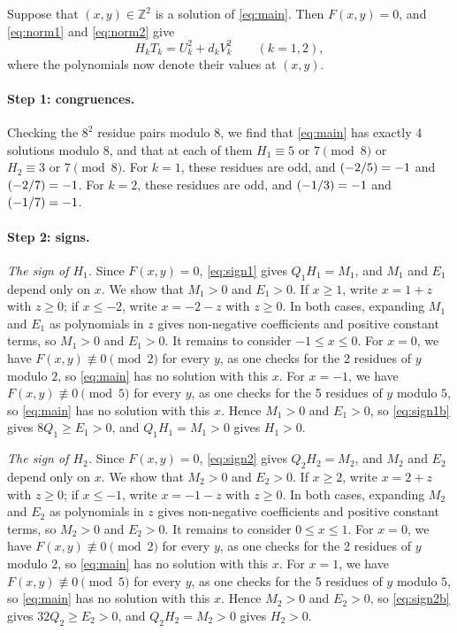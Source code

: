 \documentclass[11pt]{article}
\newcommand{\Z}{\mathbb{Z}}
\newcommand{\leg}[2]{\mathchoice{\biggl(\dfrac{#1}{#2}\biggr)}{(#1/#2)}{(#1/#2)}{(#1/#2)}}
\begin{document}
Suppose that $(x,y)\in\Z^2$ is a solution of \eqref{eq:main}. Then $F(x,y)=0$, and \eqref{eq:norm1} and \eqref{eq:norm2} give
\begin{equation}\label{eq:HT}
H_kT_k=U_k^2+d_kV_k^2\qquad(k=1,2),
\end{equation}
where the polynomials now denote their values at $(x,y)$.

\paragraph{Step 1: congruences.} Checking the $8^2$ residue pairs modulo $8$, we find that \eqref{eq:main} has exactly 4 solutions modulo $8$, and that at each of them $H_{1}\equiv5\text{ or }7\pmod{8}$ or $H_{2}\equiv3\text{ or }7\pmod{8}$. For $k=1$, these residues are odd, and $\leg{-2}{5}=-1$ and $\leg{-2}{7}=-1$. For $k=2$, these residues are odd, and $\leg{-1}{3}=-1$ and $\leg{-1}{7}=-1$.

\paragraph{Step 2: signs.} \emph{The sign of $H_{1}$.} Since $F(x,y)=0$, \eqref{eq:sign1} gives $Q_{1}H_{1}=M_{1}$, and $M_{1}$ and $E_{1}$ depend only on $x$. We show that $M_{1}>0$ and $E_{1}>0$. If $x\geq1$, write $x=1+z$ with $z\geq0$; if $x\leq-2$, write $x=-2-z$ with $z\geq0$. In both cases, expanding $M_{1}$ and $E_{1}$ as polynomials in $z$ gives non-negative coefficients and positive constant terms, so $M_{1}>0$ and $E_{1}>0$. It remains to consider $-1\leq x\leq0$. For $x=0$, we have $F(x,y)\not\equiv0\pmod{2}$ for every $y$, as one checks for the 2 residues of $y$ modulo $2$, so \eqref{eq:main} has no solution with this $x$. For $x=-1$, we have $F(x,y)\not\equiv0\pmod{5}$ for every $y$, as one checks for the 5 residues of $y$ modulo $5$, so \eqref{eq:main} has no solution with this $x$. Hence $M_{1}>0$ and $E_{1}>0$, so \eqref{eq:sign1b} gives $8Q_{1}\geq E_{1}>0$, and $Q_{1}H_{1}=M_{1}>0$ gives $H_{1}>0$.

\emph{The sign of $H_{2}$.} Since $F(x,y)=0$, \eqref{eq:sign2} gives $Q_{2}H_{2}=M_{2}$, and $M_{2}$ and $E_{2}$ depend only on $x$. We show that $M_{2}>0$ and $E_{2}>0$. If $x\geq2$, write $x=2+z$ with $z\geq0$; if $x\leq-1$, write $x=-1-z$ with $z\geq0$. In both cases, expanding $M_{2}$ and $E_{2}$ as polynomials in $z$ gives non-negative coefficients and positive constant terms, so $M_{2}>0$ and $E_{2}>0$. It remains to consider $0\leq x\leq1$. For $x=0$, we have $F(x,y)\not\equiv0\pmod{2}$ for every $y$, as one checks for the 2 residues of $y$ modulo $2$, so \eqref{eq:main} has no solution with this $x$. For $x=1$, we have $F(x,y)\not\equiv0\pmod{5}$ for every $y$, as one checks for the 5 residues of $y$ modulo $5$, so \eqref{eq:main} has no solution with this $x$. Hence $M_{2}>0$ and $E_{2}>0$, so \eqref{eq:sign2b} gives $32Q_{2}\geq E_{2}>0$, and $Q_{2}H_{2}=M_{2}>0$ gives $H_{2}>0$.
\end{document}

